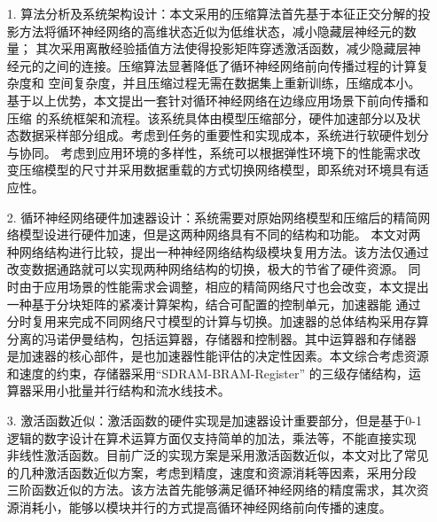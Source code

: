 \begin{itemize}
\vspace{4pt}
\item[1.]算法分析及系统架构设计：本文采用的压缩算法首先基于本征正交分解的投影方法将循环神经网络的高维状态近似为低维状态，减小隐藏层神经元的数量；
其次采用离散经验插值方法使得投影矩阵穿透激活函数，减少隐藏层神经元的之间的连接。压缩算法显著降低了循环神经网络前向传播过程的计算复杂度和
空间复杂度，并且压缩过程无需在数据集上重新训练，压缩成本小。基于以上优势，本文提出一套针对循环神经网络在边缘应用场景下前向传播和压缩
的系统框架和流程。该系统具体由模型压缩部分，硬件加速部分以及状态数据采样部分组成。考虑到任务的重要性和实现成本，系统进行软硬件划分与协同。
考虑到应用环境的多样性，系统可以根据弹性环境下的性能需求改变压缩模型的尺寸并采用数据重载的方式切换网络模型，即系统对环境具有适应性。

\vspace{4pt}
\item[2.]循环神经网络硬件加速器设计：系统需要对原始网络模型和压缩后的精简网络模型设进行硬件加速，但是这两种网络具有不同的结构和功能。
本文对两种网络结构进行比较，提出一种神经网络结构级模块复用方法。该方法仅通过改变数据通路就可以实现两种网络结构的切换，极大的节省了硬件资源。
同时由于应用场景的性能需求会调整，相应的精简网络尺寸也会改变，本文提出一种基于分块矩阵的紧凑计算架构，结合可配置的控制单元，加速器能
通过分时复用来完成不同网络尺寸模型的计算与切换。加速器的总体结构采用存算分离的冯诺伊曼结构，包括运算器，存储器和控制器。其中运算器和存储器
是加速器的核心部件，是也加速器性能评估的决定性因素。本文综合考虑资源和速度的约束，存储器采用“SDRAM-BRAM-Register”
的三级存储结构，运算器采用小批量并行结构和流水线技术。

\vspace{4pt}
\item[3.]激活函数近似：激活函数的硬件实现是加速器设计重要部分，但是基于0-1逻辑的数字设计在算术运算方面仅支持简单的加法，乘法等，不能直接实现
非线性激活函数。目前广泛的实现方案是采用激活函数近似，本文对比了常见的几种激活函数近似方案，考虑到精度，速度和资源消耗等因素，采用分段
三阶函数近似的方法。该方法首先能够满足循环神经网络的精度需求，其次资源消耗小，能够以模块并行的方式提高循环神经网络前向传播的速度。
\vspace{4pt}
\end{itemize}

